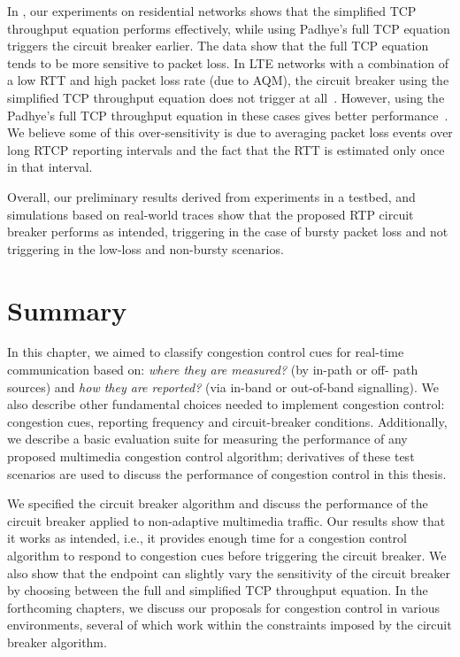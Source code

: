 In , our experiments on residential networks shows that the
simplified TCP throughput equation performs effectively, while using Padhye's
full TCP equation triggers the circuit breaker earlier. The data show that
the full TCP equation tends to be more sensitive to packet loss. In LTE
networks with a combination of a low RTT and high packet loss rate (due to
AQM), the circuit breaker using the simplified TCP throughput equation
does not trigger at all~\cite{Sarker:CB.lte}. However, using the Padhye's full TCP
throughput equation in these cases gives better
performance~\cite{Sarker:CB.lte}. We believe some of this over-sensitivity is
due to averaging packet loss events over long RTCP reporting intervals and the
fact that the RTT is estimated only once in that interval.

Overall, our preliminary results derived from experiments in a testbed,
and simulations based on real-world traces show that
the proposed RTP circuit breaker performs as intended, triggering in the case
of bursty packet loss and not triggering in the low-loss and non-bursty
scenarios. 



\section{Summary}

In this chapter, we aimed to classify congestion control cues for real-time
communication based on: \emph{where they are measured?} (by in-path or off-
path sources) and \emph{how they are reported?} (via in-band or out-of-band
signalling). We also describe other fundamental choices needed to implement
congestion control: congestion cues, reporting frequency and circuit-breaker
conditions. Additionally, we describe a basic evaluation suite for measuring
the performance of any proposed multimedia congestion control algorithm;
derivatives of these test scenarios are used to discuss the performance of
congestion control in this thesis.

We specified the circuit breaker algorithm and discuss the performance of the
circuit breaker applied to non-adaptive multimedia traffic. Our results show
that it works as intended, i.e., it provides enough time for a congestion
control algorithm to respond to congestion cues before triggering the circuit
breaker. We also show that the endpoint can slightly vary the sensitivity of
the circuit breaker by choosing between the full and simplified TCP throughput
equation. In the forthcoming chapters, we discuss our proposals for congestion
control in various environments, several of which work within the constraints
imposed by the circuit breaker algorithm.


